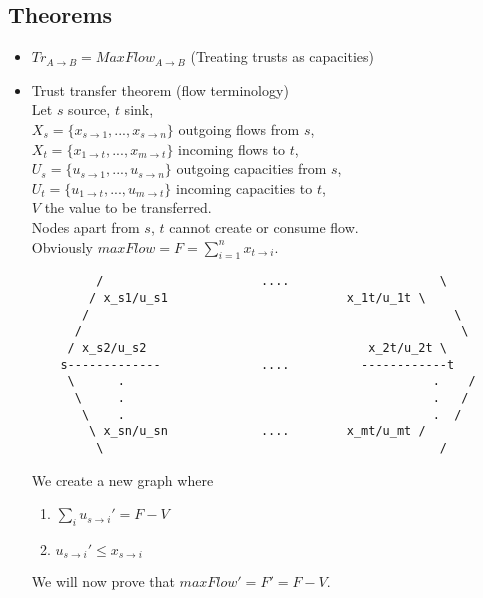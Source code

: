 \documentclass[11pt]{article}
\begin{document}
\begin{enumerate}
  \section*{Theorems}
    \begin{itemize}
    \item $Tr_{A \rightarrow B} = MaxFlow_{A \rightarrow B}$ (Treating trusts as capacities)
    
    \item Trust transfer theorem (flow terminology) \\
    Let $s$ source, $t$ sink, \\
    $X_s = \{x_{s \rightarrow 1}, ..., x_{s \rightarrow n}\}$ outgoing flows from $s$, \\
    $X_t = \{x_{1 \rightarrow t}, ..., x_{m \rightarrow t}\}$ incoming flows to $t$, \\
    $U_s = \{u_{s \rightarrow 1}, ..., u_{s \rightarrow n}\}$ outgoing capacities from $s$, \\
    $U_t = \{u_{1 \rightarrow t}, ..., u_{m \rightarrow t}\}$ incoming capacities to $t$, \\
    $V$ the value to be transferred. \\
    Nodes apart from $s$, $t$ cannot create or consume flow. \\
    Obviously $maxFlow = F = \sum_{i=1}^{n}{x_{t \rightarrow i}}$. \newpage
    \begin{lstlisting}
         /                      ....                     \
        / x_s1/u_s1                         x_1t/u_1t \
       /                                                   \
      /                                                     \
     / x_s2/u_s2                               x_2t/u_2t \
    s-------------              ....          ------------t
     \      .                                           .    /
      \     .                                           .   /
       \    .                                           .  /
        \ x_sn/u_sn             ....        x_mt/u_mt /
         \                                               /
    \end{lstlisting}
    We create a new graph where
    \begin{enumerate}
      \item  $\sum_{i}{u_{s \rightarrow i}'} = F - V$
      \item $u_{s \rightarrow i}' \leq x_{s \rightarrow i}$
    \end{enumerate}
    
    We will now prove that $maxFlow' = F' = F - V$.
    

\end{itemize}
\end{enumerate}
\end{document}
